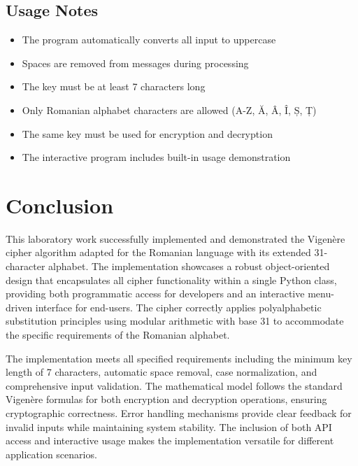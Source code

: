 \documentclass[12pt]{article}
\begin{document}
\subsection*{Usage Notes}
\begin{itemize}
    \item The program automatically converts all input to uppercase
    \item Spaces are removed from messages during processing
    \item The key must be at least 7 characters long
    \item Only Romanian alphabet characters are allowed (A-Z, Ă, Â, Î, Ș, Ț)
    \item The same key must be used for encryption and decryption
    \item The interactive program includes built-in usage demonstration
\end{itemize}

    








\section*{Conclusion}

\hspace{0.8cm}This laboratory work successfully implemented and demonstrated the Vigenère cipher algorithm adapted for the Romanian language with its extended 31-character alphabet. The implementation showcases a robust object-oriented design that encapsulates all cipher functionality within a single Python class, providing both programmatic access for developers and an interactive menu-driven interface for end-users. The cipher correctly applies polyalphabetic substitution principles using modular arithmetic with base 31 to accommodate the specific requirements of the Romanian alphabet.

The implementation meets all specified requirements including the minimum key length of 7 characters, automatic space removal, case normalization, and comprehensive input validation. The mathematical model follows the standard Vigenère formulas for both encryption and decryption operations, ensuring cryptographic correctness. Error handling mechanisms provide clear feedback for invalid inputs while maintaining system stability. The inclusion of both API access and interactive usage makes the implementation versatile for different application scenarios.




\pagebreak
\end{document}
